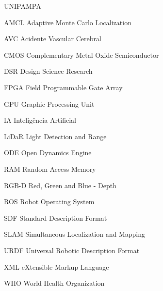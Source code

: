 \documentclass[tcc,baec]{unipampa}
\begin{document}
%
\begin{listofabbrv}{UNIPAMPA}
       \item[AMCL]  Adaptive Monte Carlo Localization
        \item[AVC]     Acidente Vascular Cerebral
        \item[CMOS]    Complementary Metal-Oxide Semiconductor
        \item[DSR]      Design Science Research
        \item[FPGA]    Field Programmable Gate Array
        \item[GPU]     Graphic Processing Unit
        \item[IA]      Inteligência Artificial
        \item[LiDaR]   Light Detection and Range
        \item[ODE]     Open Dynamics Engine
        \item[RAM]      Random Access Memory
        \item[RGB-D]   Red, Green and Blue - Depth
        \item[ROS]     Robot Operating System
        \item[SDF]      Standard Description Format
        \item[SLAM]    Simultaneous Localization and Mapping
        \item[URDF]    Universal Robotic Description Format
        \item[XML]      eXtensible Markup Language 
        \item[WHO]     World Health Organization
\end{listofabbrv}


% 
%

\tableofcontents

% 
%
\end{document}
